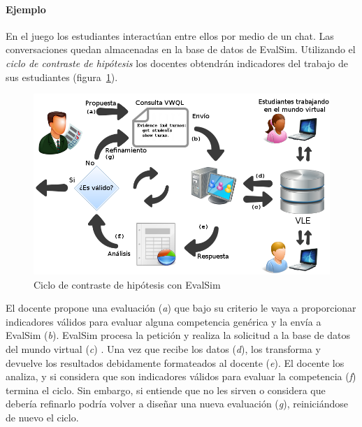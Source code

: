 			\paragraph{Ejemplo}

			En el juego los estudiantes interactúan entre ellos por medio de un chat. Las conversaciones quedan almacenadas en la base de datos de EvalSim. Utilizando el \emph{ciclo de contraste de hipótesis} los docentes obtendrán indicadores del trabajo de sus estudiantes (figura~\ref{fig:EvsDiagram}).

\begin{figure}
  \begin{center}
    \includegraphics[scale=0.4]{EvsDiagram.png}
  \end{center}
  \caption{Ciclo de contraste de hipótesis con EvalSim}
  \label{fig:EvsDiagram}
\end{figure}

			El docente propone una evaluación (\emph{a}) que bajo su criterio le vaya a proporcionar indicadores válidos para evaluar alguna competencia genérica y la envía a EvalSim (\emph{b}). EvalSim procesa la petición y realiza la solicitud a la base de datos del mundo virtual (\emph{c}) . Una vez que recibe los datos (\emph{d}), los transforma y devuelve los resultados debidamente formateados al docente (\emph{e}). El docente los analiza, y si considera que son indicadores válidos para evaluar la competencia (\emph{f}) termina el ciclo. Sin embargo, si entiende que no les sirven o considera que debería refinarlo podría volver a diseñar una nueva evaluación (\emph{g}), reiniciándose de nuevo el ciclo.



